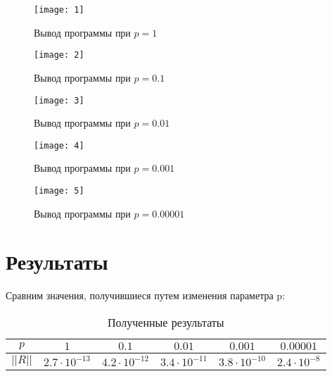 \begin{figure}[H]
\begin{center}
	\texttt{[image: 1]}
	\caption{Вывод программы при $p = 1$}
	\label{fig:p1}
\end{center}
\end{figure}

\vspace{-1.3cm}

\begin{figure}[H]
\begin{center}
	\texttt{[image: 2]}
	\caption{Вывод программы при $p = 0.1$}
	\label{fig:p2}
\end{center}
\end{figure}

\vspace{-1cm}

\begin{figure}[H]
\begin{center}
	\texttt{[image: 3]}
	\caption{Вывод программы при $p = 0.01$}
	\label{fig:p3}
\end{center}
\end{figure}

\vspace{-1cm}

\begin{figure}[H]
\begin{center}
	\texttt{[image: 4]}
	\caption{Вывод программы при $p = 0.001$}
	\label{fig:p4}
\end{center}
\end{figure}

\vspace{-1cm}

\begin{figure}[H]
\begin{center}
	\texttt{[image: 5]}
	\caption{Вывод программы при $p = 0.00001$}
	\label{fig:p5}
\end{center}
\end{figure}

\newpage

\section{Результаты}

Сравним значения, получившиеся путем изменения параметра p:

\begin{table}[H]
\begin{center}
	\caption{Полученные результаты}
	\def\tabcolsep{15pt}
	\begin{tabular}{|c|c|c|c|c|c|}
		\hline
		$p$ &
		$1$ &
		$0.1$ &
		$0.01$ &
		$0.001$ &
		$0.00001$ \\
		\hline
		$||R||$ &
		$2.7\cdot 10^{-13}$ &
		$4.2\cdot 10^{-12}$ &
		$3.4\cdot 10^{-11}$ &
		$3.8\cdot 10^{-10}$ &
		$2.4\cdot 10^{-8}$ \\
	    \hline	
	\end{tabular}
	\label{tab:results}
\end{center}
\end{table}

